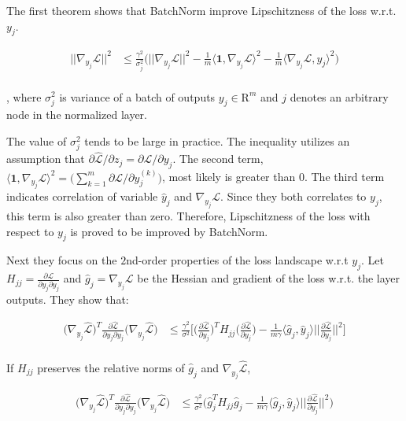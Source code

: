 \documentclass{article}
\begin{document}
The first theorem shows that BatchNorm improve Lipschitzness of the loss w.r.t. $y_j$.

\begin{align*}
	||\nabla_{y_j}\hat{\mathcal{L}}||^2&\leq\frac{\gamma^2}{\sigma^2_j}\bigg(||\nabla_{y_j}\mathcal{L}||^2
	- \frac{1}{m} \langle \mathbf{1},\nabla_{y_j}\mathcal{L} \rangle^2 
	- \frac{1}{m}\langle \nabla_{y_j}\mathcal{L}, \hat{y}_j \rangle^2 \bigg)\\
\end{align*}

, where $\sigma_j^2$ is variance of a batch of outputs $y_j\in\mathrm{R}^m$ and $j$ denotes an arbitrary node in the normalized layer. 

The value of $\sigma_j^2$ tends to be large in practice. The inequality utilizes an assumption that $\partial \hat{\mathcal{L}}/\partial z_j = \partial \mathcal{L}/\partial y_j$. The second term, $ \langle \mathbf{1},\nabla_{y_j}\mathcal{L} \rangle^2=\big( \sum_{k=1}^{m}\partial \mathcal{L}/\partial y_j^{(k)} \big)$, most likely is greater than 0. The third term indicates correlation of variable $\hat{y}_j$ and $\nabla_{y_j}\mathcal{L}$. Since they both correlates to $y_j$, this term is also greater than zero. Therefore,  Lipschitzness of the loss with respect to $y_j$ is proved to be improved by BatchNorm.

Next they focus on the $2$nd-order properties of the loss landscape w.r.t $y_j$. Let $\mathbb{\textit{H}}_{jj}=\frac{\partial\mathcal{L} }{\partial y_j\partial y_j}$ and $\hat{g}_j = \nabla_{y_j}\mathcal{L}$ be the Hessian and gradient of the loss w.r.t. the layer outputs. They show that:

\begin{align*}
	\bigg(\nabla_{y_j}\hat{\mathcal{L}}\bigg)^T\frac{\partial \hat{\mathcal{L}}}{\partial y_j\partial y_j} \bigg(\nabla_{y_j}\hat{\mathcal{L}}\bigg) &\leq 
	\frac{\gamma^2}{\sigma^2}\Bigg[
	\bigg(\frac{\partial \hat{\mathcal{L}}}{\partial y_j}\bigg)^T\mathbb{\textit{H}}_{jj}\bigg(\frac{\partial \hat{\mathcal{L}}}{\partial y_j}\bigg) -
	\frac{1}{m\gamma}\langle\hat{g}_j,\hat{y}_j\rangle\bigg|\bigg|\frac{\partial \hat{\mathcal{L}}}{\partial y_j}\bigg|\bigg|^2
	\Bigg]\\
\end{align*}

If $\mathbb{\textit{H}}_{jj}$ preserves the relative norms of $\hat{g}_j$ and $\nabla_{y_j}\hat{\mathcal{L}}$,


\begin{align*}
	\bigg(\nabla_{y_j}\hat{\mathcal{L}}\bigg)^T\frac{\partial \hat{\mathcal{L}}}{\partial y_j\partial y_j} \bigg(\nabla_{y_j}\hat{\mathcal{L}}\bigg) &\leq 
	\frac{\gamma^2}{\sigma^2}\Bigg(
	\hat{g}_j^T \mathbb{\textit{H}}_{jj} \hat{g}_j -
	\frac{1}{m\gamma}\langle\hat{g}_j,\hat{y}_j\rangle\bigg|\bigg|\frac{\partial \hat{\mathcal{L}}}{\partial y_j}\bigg|\bigg|^2
	\Bigg)\\
\end{align*}
\end{document}
